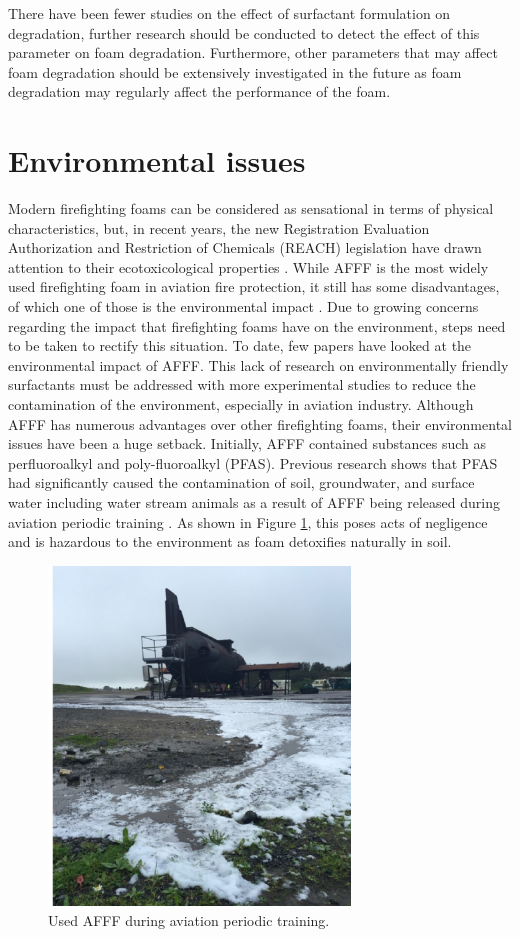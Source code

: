 \documentclass[12pt]{report}
\begin{document}
There have been fewer studies on the effect of surfactant formulation on degradation, further research should be conducted to detect the effect of this parameter on foam degradation. Furthermore, other parameters that may affect foam degradation should be extensively investigated in the future as foam degradation may regularly affect the performance of the foam.

\section{Environmental issues}
Modern firefighting foams can be considered as sensational in terms of physical characteristics, but, in recent years, the new Registration Evaluation Authorization and Restriction of Chemicals (REACH) legislation have drawn attention to their ecotoxicological properties \cite{turekova2011environmental}. While AFFF is the most widely used firefighting foam in aviation fire protection, it still has some disadvantages, of which one of those is the environmental impact \cite{zhao2016improving}. Due to growing concerns regarding the impact that firefighting foams have on the environment, steps need to be taken to rectify this situation. To date, few papers have looked at the environmental impact of AFFF. This lack of research on environmentally friendly surfactants must be addressed with more experimental studies to reduce the contamination of the environment, especially in aviation industry.
Although AFFF has numerous advantages over other firefighting foams, their environmental issues have been a huge setback. Initially, AFFF contained substances such as perfluoroalkyl and poly-fluoroalkyl (PFAS). Previous research shows that PFAS had significantly caused the contamination of soil, groundwater, and surface water including water stream animals as a result of AFFF being released during aviation periodic training \cite{milley2018estimating}. As shown in Figure \ref{ch2:figure:use}, this poses acts of negligence and is hazardous to the environment as foam detoxifies naturally in soil.

\begin{figure}[H]
    \centering
    \includegraphics[width=\textwidth,height=9cm]{use_during_aviation_training.jpg}
    \caption{Used AFFF during aviation periodic training.}
    \label{ch2:figure:use}
\end{figure}
\end{document}
